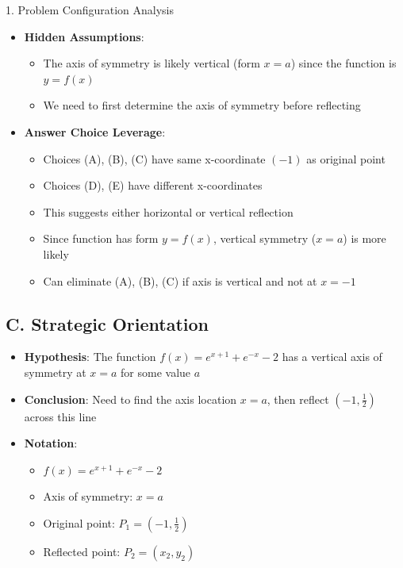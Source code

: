 \documentclass[12pt]{article}
\begin{document}
\begin{configbox}{1. Problem Configuration Analysis}
\begin{itemize}[leftmargin=*]
    \item \textbf{Hidden Assumptions}: 
    \begin{itemize}
        \item The axis of symmetry is likely vertical (form $x = a$) since the function is $y = f(x)$
        \item We need to first determine the axis of symmetry before reflecting
    \end{itemize}
    
    \item \textbf{Answer Choice Leverage}: 
    \begin{itemize}
        \item Choices (A), (B), (C) have same x-coordinate $(-1)$ as original point
        \item Choices (D), (E) have different x-coordinates
        \item This suggests either horizontal or vertical reflection
        \item Since function has form $y = f(x)$, vertical symmetry ($x = a$) is more likely
        \item Can eliminate (A), (B), (C) if axis is vertical and not at $x = -1$
    \end{itemize}
\end{itemize}

\subsection*{C. Strategic Orientation}
\begin{itemize}[leftmargin=*]
    \item \textbf{Hypothesis}: The function $f(x) = e^{x+1}+e^{-x}-2$ has a vertical axis of symmetry at $x = a$ for some value $a$
    
    \item \textbf{Conclusion}: Need to find the axis location $x = a$, then reflect $(-1, \frac{1}{2})$ across this line
    
    \item \textbf{Notation}: 
    \begin{itemize}
        \item $f(x) = e^{x+1}+e^{-x}-2$
        \item Axis of symmetry: $x = a$
        \item Original point: $P_1 = (-1, \frac{1}{2})$
        \item Reflected point: $P_2 = (x_2, y_2)$
    \end{itemize}
    

\end{itemize}
\end{configbox}
\end{document}
